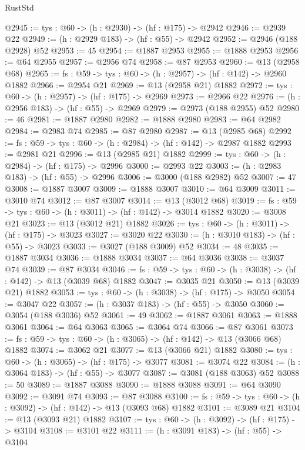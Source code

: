 \begin{lexlean}{RustStd}
\begin{coremodule}
@2945 := {tys : @60} -> (h : @2930) -> (hf : @175) -> @2942
@2946 := @2939 @22
@2949 := (h : @2929 @183) -> (hf : @55) -> @2942
@2952 := @2946 (@188 @2928) @52
@2953 := 45
@2954 := @1887 @2953
@2955 := @1888 @2953
@2956 := @64 @2955
@2957 := @2956 @74
@2958 := @87 @2953
@2960 := @13 (@2958 @68)
@2965 := {fs : @59} -> {tys : @60} -> (h : @2957) -> (hf : @142) -> @2960 @1882
@2966 := @2954 @21
@2969 := @13 (@2958 @21) @1882
@2972 := {tys : @60} -> (h : @2957) -> (hf : @175) -> @2969
@2973 := @2966 @22
@2976 := (h : @2956 @183) -> (hf : @55) -> @2969
@2979 := @2973 (@188 @2955) @52
@2980 := 46
@2981 := @1887 @2980
@2982 := @1888 @2980
@2983 := @64 @2982
@2984 := @2983 @74
@2985 := @87 @2980
@2987 := @13 (@2985 @68)
@2992 := {fs : @59} -> {tys : @60} -> (h : @2984) -> (hf : @142) -> @2987 @1882
@2993 := @2981 @21
@2996 := @13 (@2985 @21) @1882
@2999 := {tys : @60} -> (h : @2984) -> (hf : @175) -> @2996
@3000 := @2993 @22
@3003 := (h : @2983 @183) -> (hf : @55) -> @2996
@3006 := @3000 (@188 @2982) @52
@3007 := 47
@3008 := @1887 @3007
@3009 := @1888 @3007
@3010 := @64 @3009
@3011 := @3010 @74
@3012 := @87 @3007
@3014 := @13 (@3012 @68)
@3019 := {fs : @59} -> {tys : @60} -> (h : @3011) -> (hf : @142) -> @3014 @1882
@3020 := @3008 @21
@3023 := @13 (@3012 @21) @1882
@3026 := {tys : @60} -> (h : @3011) -> (hf : @175) -> @3023
@3027 := @3020 @22
@3030 := (h : @3010 @183) -> (hf : @55) -> @3023
@3033 := @3027 (@188 @3009) @52
@3034 := 48
@3035 := @1887 @3034
@3036 := @1888 @3034
@3037 := @64 @3036
@3038 := @3037 @74
@3039 := @87 @3034
@3046 := {fs : @59} -> {tys : @60} -> (h : @3038) -> (hf : @142) -> @13 (@3039 @68) @1882
@3047 := @3035 @21
@3050 := @13 (@3039 @21) @1882
@3053 := {tys : @60} -> (h : @3038) -> (hf : @175) -> @3050
@3054 := @3047 @22
@3057 := (h : @3037 @183) -> (hf : @55) -> @3050
@3060 := @3054 (@188 @3036) @52
@3061 := 49
@3062 := @1887 @3061
@3063 := @1888 @3061
@3064 := @64 @3063
@3065 := @3064 @74
@3066 := @87 @3061
@3073 := {fs : @59} -> {tys : @60} -> (h : @3065) -> (hf : @142) -> @13 (@3066 @68) @1882
@3074 := @3062 @21
@3077 := @13 (@3066 @21) @1882
@3080 := {tys : @60} -> (h : @3065) -> (hf : @175) -> @3077
@3081 := @3074 @22
@3084 := (h : @3064 @183) -> (hf : @55) -> @3077
@3087 := @3081 (@188 @3063) @52
@3088 := 50
@3089 := @1887 @3088
@3090 := @1888 @3088
@3091 := @64 @3090
@3092 := @3091 @74
@3093 := @87 @3088
@3100 := {fs : @59} -> {tys : @60} -> (h : @3092) -> (hf : @142) -> @13 (@3093 @68) @1882
@3101 := @3089 @21
@3104 := @13 (@3093 @21) @1882
@3107 := {tys : @60} -> (h : @3092) -> (hf : @175) -> @3104
@3108 := @3101 @22
@3111 := (h : @3091 @183) -> (hf : @55) -> @3104

\end{coremodule}
\end{lexlean}
